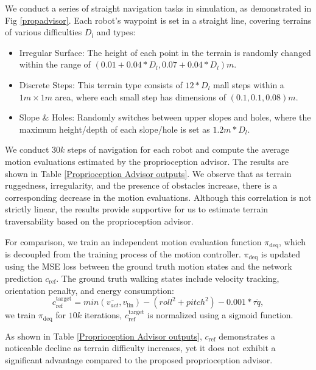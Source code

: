 \documentclass[conference]{IEEEtran}
\begin{document}
 We conduct a series of straight navigation tasks in simulation, as demonstrated in Fig \ref{propadvisor}. Each robot's waypoint is set in a straight line, covering terrains of various difficulties $D_l$ and types:

\begin{itemize}
    \item Irregular Surface: The height of each point in the terrain is randomly changed within the range of $(0.01+0.04*D_l,0.07+0.04*D_l)m$.
    \item Discrete Steps: This terrain type consists of  $12*D_l$ mall steps within a $1m \times 1m$ area, where each small step has dimensions of $(0.1,0.1,0.08)m$.
    \item Slope \& Holes: Randomly switches between upper slopes and holes, where the maximum height/depth of each slope/hole is set as  $1.2m*D_l$.
\end{itemize}

We conduct $30k$ steps of navigation for each robot and compute the average motion evaluations estimated by the proprioception advisor. The results are shown in Table \ref{Proprioception Advisor outputs}. We observe that as terrain ruggedness, irregularity, and the presence of obstacles increase, there is a corresponding decrease in the motion evaluations. Although this correlation is not strictly linear, the results provide supportive for us to estimate terrain traversability based on the proprioception advisor. 

For comparison, we train an independent motion evaluation function $\pi_\textrm{deq}$, which is decoupled from the training process of the motion controller. $\pi_\textrm{deq}$ is updated using the MSE loss between the ground truth motion states and the network prediction $c_\textrm{ref}$. The ground truth walking states include velocity tracking, orientation penalty, and energy consumption:
\begin{equation}
    c^\textrm{target}_\textrm{ref}=min(\overline{v_{act}},v_\textrm{lin})-(roll^2+pitch^2)-0.001*\tau \dot {q},
\end{equation}
we train $\pi_\textrm{deq}$ for $10k$ iterations, $c^\textrm{target}_\textrm{ref}$ is normalized using a sigmoid function.  

As shown in Table \ref{Proprioception Advisor outputs}, $c_\textrm{ref}$ demonstrates a noticeable decline as terrain difficulty increases, yet it does not exhibit a significant advantage compared to the proposed proprioception advisor.
\end{document}
